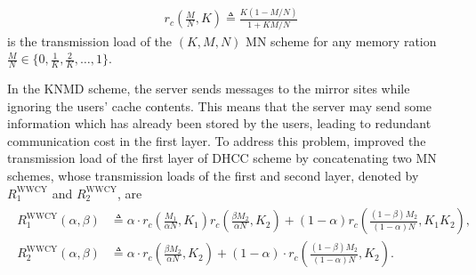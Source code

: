 \documentclass[onecolumn,10pt]{IEEEtran}
\theoremstyle{mythm}
\begin{document}
\begin{eqnarray*}
  r_c\left(\frac{M}{N},K\right)  \triangleq \frac{K (1-M/N)}{1+KM/N}
\end{eqnarray*}is the transmission load of the $(K,M,N)$ MN scheme for any memory ration $\frac{M}{N}\in\{0,\frac{1}{K},\frac{2}{K},\ldots,1\}$.



In the KNMD scheme, the server sends messages to the mirror sites while ignoring the users' cache contents. This means that the server may send some information which has already been stored by the users, leading to redundant communication cost in the first layer.  To address this problem,   \cite[Section VI]{WWCY}   improved the transmission load of the first layer of DHCC scheme by concatenating two MN schemes, whose transmission loads of the first and second layer, denoted by $R^\text{WWCY}_1$ and $R^\text{WWCY}_2$,  are %
\begin{eqnarray}
\label{eq-load-W}
\begin{split}
R^\text{WWCY}_1(\alpha,\beta)&\triangleq   \alpha \cdot r_c\left(\frac{M_1}{\alpha N},K_1\right)r_c\left(\frac{\beta M_2}{\alpha N},K_2\right)
+(1-\alpha)r_c\left(\frac{(1-\beta)M_2}{(1-\alpha)N},K_1K_2\right),\\
 R^\text{WWCY}_2(\alpha,\beta)&\triangleq  \alpha\cdot r_c\left(\frac{\beta M_2}{\alpha N},K_2\right)
+(1-\alpha)\cdot r_c\left(\frac{(1-\beta)M_2}{(1-\alpha)N},K_2 \right).
\end{split}
\end{eqnarray}
\end{document}
